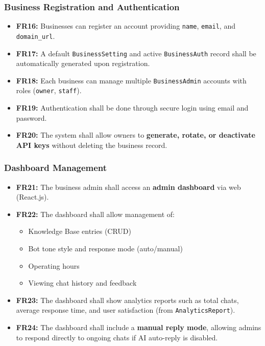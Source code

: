 \documentclass[12pt,a4paper]{article}
\begin{document}
\vspace{1em}
\noindent\hrulefill
\vspace{1em}

\subsubsection{Business Registration and Authentication}
\begin{itemize}
    \item \textbf{FR16:} Businesses can register an account providing \texttt{name}, \texttt{email}, and \texttt{domain\_url}.
    \item \textbf{FR17:} A default \texttt{BusinessSetting} and active \texttt{BusinessAuth} record shall be automatically generated upon registration.
    \item \textbf{FR18:} Each business can manage multiple \texttt{BusinessAdmin} accounts with roles (\texttt{owner}, \texttt{staff}).
    \item \textbf{FR19:} Authentication shall be done through secure login using email and password.
    \item \textbf{FR20:} The system shall allow owners to \textbf{generate, rotate, or deactivate API keys} without deleting the business record.
\end{itemize}

\vspace{1em}
\noindent\hrulefill
\vspace{1em}

\subsubsection{Dashboard Management}
\begin{itemize}
    \item \textbf{FR21:} The business admin shall access an \textbf{admin dashboard} via web (React.js).
    \item \textbf{FR22:} The dashboard shall allow management of:
    \begin{itemize}
        \item Knowledge Base entries (CRUD)
        \item Bot tone style and response mode (auto/manual)
        \item Operating hours
        \item Viewing chat history and feedback
    \end{itemize}
    \item \textbf{FR23:} The dashboard shall show analytics reports such as total chats, average response time, and user satisfaction (from \texttt{AnalyticsReport}).
    \item \textbf{FR24:} The dashboard shall include a \textbf{manual reply mode}, allowing admins to respond directly to ongoing chats if AI auto-reply is disabled.
\end{itemize}
\end{document}
